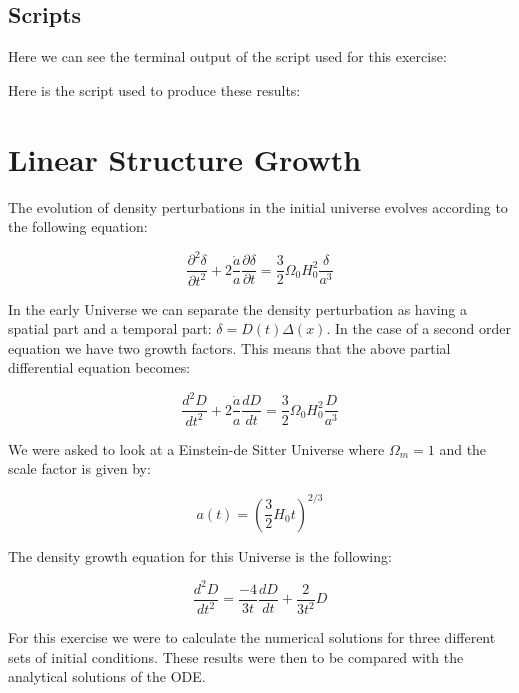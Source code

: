 \documentclass[a4paper,10pt]{article}
\begin{document}
\subsection{Scripts}

Here we can see the terminal output of the script used for this exercise:


Here is the script used to produce these results: 


\section{Linear Structure Growth}

The evolution of density perturbations in the initial universe evolves according to the following equation: 

\begin{equation}
\frac{\partial^2\delta}{\partial t^2} + 2\frac{\dot{a}}{a}\frac{\partial\delta}{\partial t} = \frac{3}{2}\Omega_0H_0^2\frac{\delta}{a^3}
\end{equation}

In the early Universe we can separate the density perturbation as having a spatial part and a temporal part: $\delta = D(t)\Delta(x)$. In the case of a second order equation we have two growth factors. This means that the above partial differential equation becomes: 

\begin{equation}
\frac{d^2D}{d t^2} + 2\frac{\dot{a}}{a}\frac{dD}{dt} = \frac{3}{2}\Omega_0H_0^2\frac{D}{a^3}
\end{equation}

We were asked to look at a Einstein-de Sitter Universe where $\Omega_m = 1$ and the scale factor is given by: 

\begin{equation}
a(t) = (\frac{3}{2}H_0t)^{2/3}
\end{equation}

The density growth equation for this Universe is the following: 

\begin{equation}
\frac{d^2D}{dt^2} = \frac{-4}{3t} \frac{dD}{dt} + \frac{2}{3t^2} D
\end{equation}

For this exercise we were to calculate the numerical solutions for three different sets of initial conditions. These results were then to be compared with the analytical solutions of the ODE. 
\end{document}
